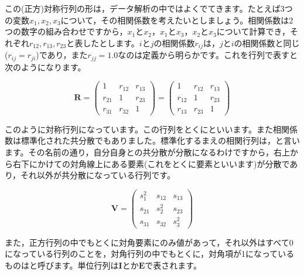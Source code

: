 \documentclass{ltjsbook}
\begin{document}
この(正方)対称行列の形は，データ解析の中ではよくでてきます。たとえば3つの変数$x_1,x_2,x_3$について，その相関係数を考えたいとしましょう。相関係数は2つの数字の組み合わせですから，$x_1$と$x_2$，$x_1$と$x_3$，$x_2$と$x_3$について計算でき，それぞれ$r_{12},r_{13},r_{23}$と表したとします。$i$と$j$の相関係数$r_{ij}$は，$j$と$i$の相関係数と同じ($r_{ij}=r_{ji}$)であり，また$r_{jj}=1.0$なのは定義から明らかです。これを行列で表すと次のようになります。

\begin{equation*}
    \bm{R} =
    \begin{pmatrix}
        1      & r_{12} & r_{13} \\
        r_{21} & 1      & r_{23} \\
        r_{31} & r_{32} & 1
    \end{pmatrix}=
    \begin{pmatrix}
        1      & r_{12} & r_{13} \\
        r_{12} & 1      & r_{23} \\
        r_{13} & r_{23} & 1
    \end{pmatrix}
\end{equation*}

このように対称行列になっています。この行列をとくにといいます。また相関係数は標準化された共分散でもありました。標準化するまえの相関行列は，と言います。その名前の通り，自分自身との共分散が分散になるわけですから，右上から右下にかけての対角線上にある要素(これをとくに要素といいます)が分散であり，それ以外が共分散になっている行列です。

\begin{equation*}
    \bm{V} =
    \begin{pmatrix}
        s_1^2  & s_{12} & s_{13} \\
        s_{21} & s_2^2  & s_{23} \\
        s_{31} & s_{32} & s_3^2
    \end{pmatrix}
\end{equation*}

また，正方行列の中でもとくに対角要素にのみ値があって，それ以外はすべて$0$になっている行列のことを，対角行列の中でもとくに，対角項が1になっているものはと呼びます。単位行列は$\bm{I}$とか$\bm{E}$で表されます。
\end{document}
